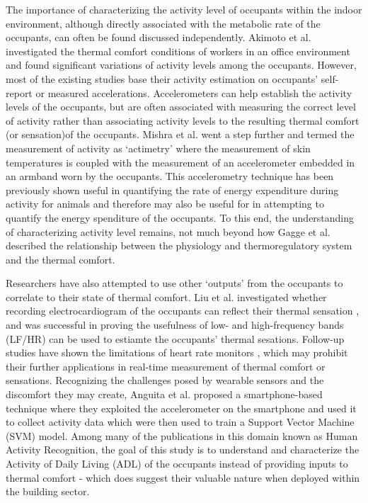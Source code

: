 	The importance of characterizing the activity level of occupants within the indoor environment, although directly associated with the metabolic rate of the occupants, can often be found discussed independently. Akimoto et al. investigated the thermal comfort conditions of workers in an office environment and found significant variations of activity levels among the occupants\cite{akimoto_thermal_2010}. However, most of the existing studies base their activity estimation on occupants' self-report \cite{huang_potential_2015} or measured accelerations. Accelerometers can help establish the activity levels of the occupants\cite{rothney_validity_2008}, but are often associated with measuring the correct level of activity rather than associating activity levels to the resulting thermal comfort (or sensation)of the occupants. Mishra et al. went a step further and termed the measurement of activity as `actimetry' where the measurement of skin temperatures is coupled with the measurement of an accelerometer embedded in an armband worn by the occupants\cite{mishra_actimetry_2019}. This accelerometry technique has been previously shown useful in quantifying the rate of energy expenditure during activity for animals \cite{wilson_moving_2006} and therefore may also be useful for in attempting to quantify the energy spenditure of the occupants. 
	To this end, the understanding of characterizing activity level remains, not much beyond how Gagge et al. described the relationship between the physiology and thermoregulatory system and the thermal comfort\cite{gagge_comfort_1967}. 

	Researchers have also attempted to use other `outputs' from the occupants to correlate to their state of thermal comfort. Liu et al. investigated whether recording electrocardiogram of the occupants can reflect their thermal sensation \cite{liu_heart_2008}, and was successful in proving the usefulness of low- and high-frequency bands (LF/HR) can be used to estiamte the occupants' thermal sesations. Follow-up studies have shown the limitations of heart rate monitors \cite{gillinov_variable_2017}, which may prohibit their further applications in real-time measurement of thermal comfort or sensations. Recognizing the challenges posed by wearable sensors and the discomfort they may create, Anguita et al. proposed a smartphone-based technique where they exploited the accelerometer on the smartphone and used it to collect activity data which were then used to train a Support Vector Machine (SVM) model. Among many of the publications in this domain known as Human Activity Recognition, the goal of this study is to understand and characterize the Activity of Daily Living (ADL) of the occupants instead of providing inputs to thermal comfort - which does suggest their valuable nature when deployed within the building sector. 


